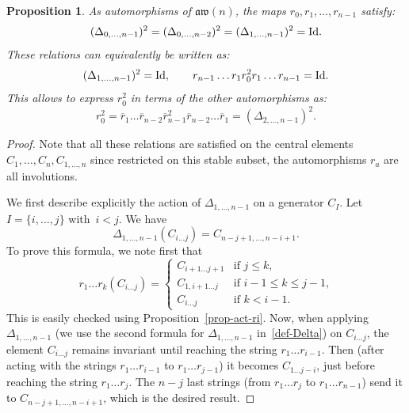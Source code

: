 \documentclass[pdftex]{sigma}
\numberwithin{equation}{section}
\newtheorem{prop}[theo]{Proposition}
\theoremstyle{definition}
\newcommand{\rb}{\overline{r}}
\newcommand{\aw}{\mathfrak{aw}(n)}
\begin{document}
\begin{prop}\label{prop-Delta}
As automorphisms of $\aw$, the maps $r_0,r_1,\dots,r_{n-1}$ satisfy:
\[(\Delta_{0,\dots,n-1})^2=(\Delta_{0,\dots,n-2})^2=(\Delta_{1,\dots,n-1})^2={\rm Id} .\]
These relations can equivalently be written as:
\begin{gather}
(\Delta_{1,\dots,n-1})^2={\rm Id} , \qquad
r_{n-1}\dots r_1 r_0^2r_1\dots r_{n-1}={\rm Id}.\label{rel-quotient-braid}
\end{gather}
This allows to express $r_0^2$ in terms of the other automorphisms as:
\[
r_0^2=\rb_1\dots \rb_{n-2}\rb_{n-1}^2\rb_{n-2}\dots \rb_1=(\Delta_{2,\dots,n-1})^2 .
\]
\end{prop}
\begin{proof}
Note that all these relations are satisfied on the central elements $C_1,\dots,C_n,C_{1,\dots,n}$ since restricted on this stable subset, the automorphisms $r_a$ are all involutions.

We first describe explicitly the action of $\Delta_{1,\dots,n-1}$ on a generator $C_I$. Let $I=\{i,\dots,j\}$ with~$i< j$. We have
\begin{equation*}%
\Delta_{1,\dots,n-1}(C_{i\dots j})=C_{n-j+1,\dots,n-i+1} .
\end{equation*}
To prove this formula, we note first that
\[r_1\dots r_k (C_{i\dots j})=\begin{cases}
C_{i+1\dots j+1} & \text{if $j\leq k$,}\\
C_{1,i+1\dots j} & \text{if $i-1\leq k\leq j-1$,}\\
C_{i\dots j} & \text{if $k<i-1$.}
\end{cases}
\]
This is easily checked using Proposition~\ref{prop-act-ri}. Now, when applying $\Delta_{1,\dots,n-1}$ (we use the second formula for $\Delta_{1,\dots,n-1}$ in~\eqref{def-Delta}) on $C_{i\dots j}$, the element $C_{i\dots j}$ remains invariant until reaching the string $r_1\dots r_{i-1}$. Then (after acting with the strings $r_1\dots r_{i-1}$ to $r_1\dots r_{j-1}$) it becomes $C_{1\dots j-i}$, just before reaching the string $r_1\dots r_j$. The $n-j$ last strings (from $r_1\dots r_j$ to $r_1\dots r_{n-1}$) send it to $C_{n-j+1,\dots,n-i+1}$, which is the desired result.


\end{proof}
\end{document}
